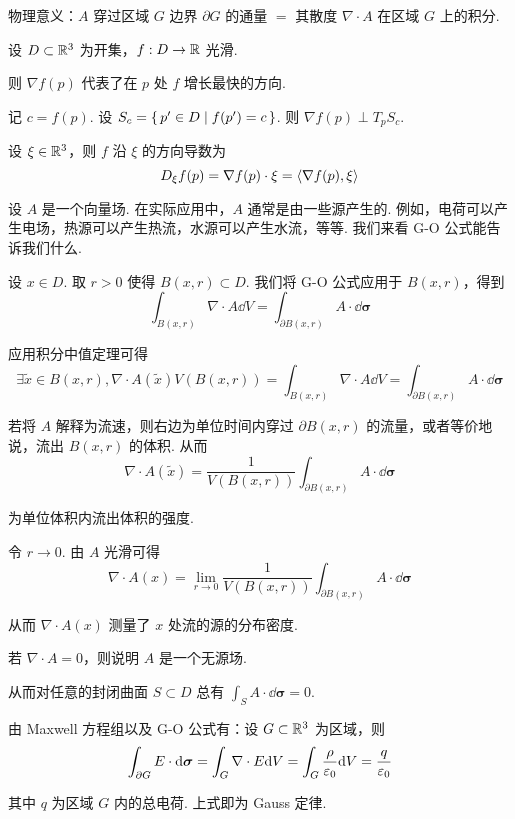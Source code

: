 \textcolor{mydarkblue}{物理意义：}$A$ 穿过区域 $G$ 边界 $\partial G$ 的通量 $=$ 其散度 $\nabla\cdot A$ 在区域 $G$ 上的积分.



设 $D\subset\mathbb{R}^3$ 为开集，$f:D\to\mathbb{R}$ 光滑.

则 $\nabla f(p)$ 代表了在 $p$ 处 $f$ 增长最快的方向.

记 $c=f(p)$. 设 $S_c=\set{p'\in D|f(p')=c}$. 则 $\nabla f(p)\perp T_pS_c$.


设 $\xi\in\mathbb{R}^3$，则 $f$ 沿 $\xi$ 的方向导数为
$$
D_\xi f(p)=\nabla f(p)\cdot\xi=\left\langle{\nabla f(p),\xi}\right\rangle
$$


设 $A$ 是一个向量场. 在实际应用中，$A$ 通常是由一些源产生的. 例如，电荷可以产生电场，热源可以产生热流，水源可以产生水流，等等. 我们来看 G-O 公式能告诉我们什么.

设 $x\in D$. 取 $r>0$ 使得 $B(x,r)\subset D$. 我们将 G-O 公式应用于 $B(x,r)$，得到
$$
\int_{B(x,r)}\nabla\cdot A\dd V=\int_{\partial B(x,r)}A\cdot\dd\bm{\sigma}
$$

应用积分中值定理可得
$$
\exists \widetilde{x}\in B(x,r),\nabla\cdot A(\widetilde{x})V(B(x,r))=\int_{B(x,r)}\nabla\cdot A\dd V=\int_{\partial B(x,r)}A\cdot\dd\bm{\sigma}
$$

若将 $A$ 解释为流速，则右边为单位时间内穿过 $\partial B(x,r)$ 的流量，或者等价地说，流出 $B(x,r)$ 的体积. 从而
$$
\nabla\cdot A(\widetilde{x})=\frac{1}{V(B(x,r))}\int_{\partial B(x,r)}A\cdot\dd\bm{\sigma}
$$

为单位体积内流出体积的强度.

令 $r\to 0$. 由 $A$ 光滑可得
$$
\nabla\cdot A(x)=\lim_{r\to 0}\frac{1}{V(B(x,r))}\int_{\partial B(x,r)}A\cdot\dd\bm{\sigma}
$$

从而 $\nabla\cdot A(x)$ 测量了 $x$ 处流的源的分布密度.

\begin{example}
    若 $\nabla\cdot A=0$，则说明 $A$ 是一个无源场.

    从而对任意的封闭曲面 $S\subset D$ 总有 $\displaystyle\int_SA\cdot\dd\bm{\sigma}=0$.
\end{example}

\begin{example}[ Gauss 定律]
    由 Maxwell 方程组以及 G-O 公式有：设 $G\subset\mathbb{R}^3$ 为区域，则
$$
\int_{\partial G}E\cdot\mathrm{d}\bm{\sigma}=\int_G\nabla\cdot E\mathrm{d} V=\int_G\frac{\rho}{\varepsilon_0}\mathrm{d} V=\frac{q}{\varepsilon_0}
$$

    其中 $q$ 为区域 $G$ 内的总电荷. 上式即为 Gauss 定律.
\end{example}

